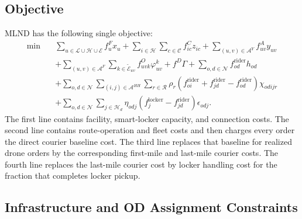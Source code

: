 \documentclass[final,3p,authoryear]{elsarticle}
\begin{document}
\subsection{Objective}

MLND has the following single objective:
\begin{align}
\min\quad
&
\sum_{u\in\mathcal L\cup\mathcal H\cup\mathcal E}f_u^{F}x_u
+
\sum_{i\in\mathcal H}\sum_{c\in\mathcal C}f_{ic}^{C}z_{ic}
+
\sum_{(u,v)\in\mathcal A^{Y}}f_{uv}^{A}y_{uv}
\nonumber\\
&+
\sum_{(u,v)\in\mathcal A^{F}}
\sum_{k\in\widetilde{\mathcal E}_{uv}}
f_{uvk}^{O}\varphi_{uv}^{k}
+f^{D}\Gamma
+
\sum_{o,d\in\mathcal N}f_{od}^{\mathrm{rider}}h_{od}
\nonumber\\
&+
\sum_{o,d\in\mathcal N}
\sum_{(i,j)\in\mathcal A^{HH}}
\sum_{r\in\mathcal R}
\rho_r
\left(
f_{oi}^{\mathrm{rider}}
+f_{jd}^{\mathrm{rider}}
-f_{od}^{\mathrm{rider}}
\right)
\chi_{odijr}
\nonumber\\
&+
\sum_{o,d\in\mathcal N}
\sum_{j\in\mathcal H_d}
\eta_{odj}
\left(
f_j^{\mathrm{locker}}
-f_{jd}^{\mathrm{rider}}
\right)
\epsilon_{odj}.
\label{app:objective}
\end{align}
The first line contains facility, smart-locker capacity, and connection costs.
The second line contains route-operation and fleet costs and then charges every order the direct courier baseline cost.
The third line replaces that baseline for realized drone orders by the corresponding first-mile and last-mile courier costs.
The fourth line replaces the last-mile courier cost by locker handling cost for the fraction that completes locker pickup.

\subsection{Infrastructure and OD Assignment Constraints}
\end{document}
